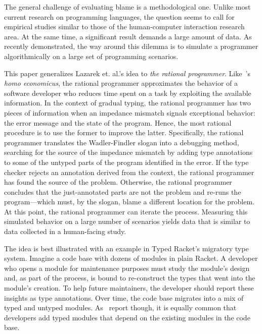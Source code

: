 
The general challenge of evaluating blame is a methodological one. Unlike most
current research on programming languages, the question seems to call for
empirical studies similar to those of the human-computer interaction research
area. At the same time, a significant result demands a large amount of
data. As~\citet{lksfd-popl-2020} recently demonstrated, the way around this
dilemma is to simulate a programmer algorithmically on a large set
of programming scenarios.



This paper generalizes Lazarek et. al.'s idea to {\em the rational
programmer\/}.  Like~\citet{mill1874essays}'s {\it homo economicus\/}, the
rational programmer approximates the behavior of a software developer who
reduces time spent on a task by exploiting the available information. In the
context of gradual typing, the rational programmer has two pieces of information
when an impedance mismatch signals exceptional behavior: the error message and
the state of the program. Hence, the most rational procedure is to use the
former to improve the latter. Specifically, the rational programmer translates
the Wadler-Findler slogan into a debugging method, searching for the source of
the impedance mismatch by adding type annotations to some of the untyped parts
of the program identified in the error.  If the type checker rejects an
annotation derived from the context, the rational programmer has found the
source of the problem.  Otherwise, the rational programmer concludes that the
just-annotated parts are not the problem and re-runs the program---which must,
by the slogan, blame a different location for the problem. At this point, the
rational programmer can iterate the process.  Measuring this simulated behavior
on a large number of scenarios yields data that is similar to data collected in
a human-facing study.

The idea is best illustrated with an example in Typed Racket's migratory type
system. Imagine a code base with dozens of modules in plain Racket. A developer
who opens a module for maintenance purposes must study the module's design and,
as part of the process, is bound to re-construct the types that went into the
module's creation.  To help future maintainers, the developer should report
these insights as type annotations. Over time, the code base migrates into a mix
of typed and untyped modules. As~\citet{tfffgksst-snapl-2017} report though,
it is equally common that developers add typed modules that depend on
the existing modules in the code base.

